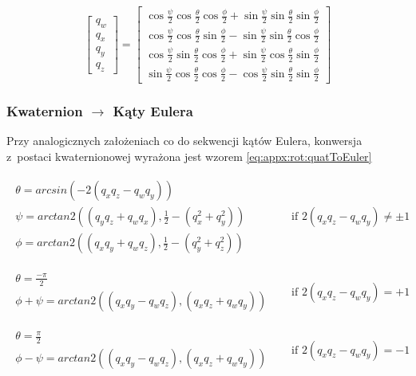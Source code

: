 \begin{equation}
	\label{eq:appx:rot:eulerToQuat}
	\begin{bmatrix}
		q_w \\
		q_x \\
		q_y \\
		q_z 
	\end{bmatrix} 
	= 
	\begin{bmatrix}
		\cos{\frac{\psi}{2}}\cos{\frac{\theta}{2}}\cos{\frac{\phi}{2}}+\sin{\frac{\psi}{2}}\sin{\frac{\theta}{2}}\sin{\frac{\phi}{2}} \\
		\cos{\frac{\psi}{2}}\cos{\frac{\theta}{2}}\sin{\frac{\phi}{2}}-\sin{\frac{\psi}{2}}\sin{\frac{\theta}{2}}\cos{\frac{\phi}{2}} \\
		\cos{\frac{\psi}{2}}\sin{\frac{\theta}{2}}\cos{\frac{\phi}{2}}+\sin{\frac{\psi}{2}}\cos{\frac{\theta}{2}}\sin{\frac{\phi}{2}} \\
		\sin{\frac{\psi}{2}}\cos{\frac{\theta}{2}}\cos{\frac{\phi}{2}}-\cos{\frac{\psi}{2}}\sin{\frac{\theta}{2}}\sin{\frac{\phi}{2}} 
	\end{bmatrix}
\end{equation}
		
\subsubsection*{Kwaternion $\rightarrow$ Kąty Eulera}
Przy analogicznych założeniach co do sekwencji kątów Eulera, konwersja z~postaci kwaternionowej wyrażona jest wzorem \eqref{eq:appx:rot:quatToEuler}
		
\begin{equation}	
	\label{eq:appx:rot:quatToEuler}
	\begin{matrix}
		\begin{matrix}                                                   
		\theta = arcsin(-2(q_x q_z-q_w q_y))                             \\
		\psi = arctan2((q_y q_z + q_w q_x), \frac{1}{2}-(q_x^2 + q_y^2)) \\
		\phi = arctan2((q_x q_y + q_w q_z), \frac{1}{2}-(q_y^2 + q_z^2)) 
	\end{matrix} & \quad \text{if } 2(q_x q_z-q_w q_y) \ne \pm 1 \\
	& \\	
	& \\
	\begin{matrix}
		\theta = \frac{-\pi}{2}                                         \\
		\phi + \psi = arctan2((q_x q_y - q_w q_z), (q_x q_z + q_w q_y)) 
	\end{matrix} & \quad \text{if } 2(q_x q_z-q_w q_y) = +1 \\
	& \\	
	& \\
	\begin{matrix}
		\theta = \frac{\pi}{2}                                          \\
		\phi - \psi = arctan2((q_x q_y - q_w q_z), (q_x q_z + q_w q_y)) 
	\end{matrix} & \quad \text{if } 2(q_x q_z-q_w q_y) = -1 
	\end{matrix}
\end{equation}
		
